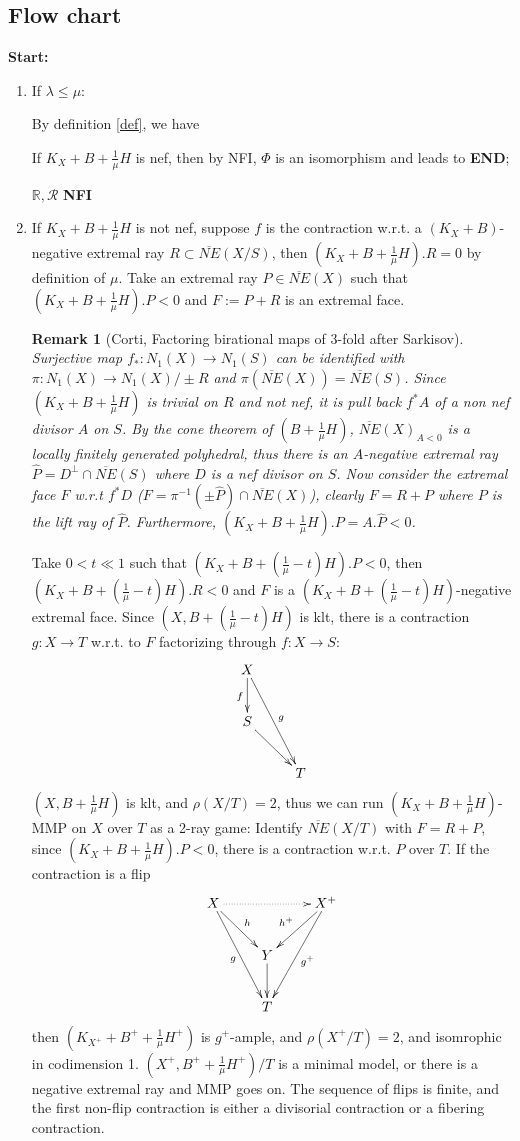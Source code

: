 \documentclass{article}
\newtheorem{rmk}[defn]{Remark}
\begin{document}
\subsection{Flow chart}

\textbf{Start:}
\begin{enumerate}[step 1]
\item If $ \lambda\leqslant\mu $:

By definition \ref{def}, we have 

If $ K_X+B+\frac{1}{\mu}H $ is nef, then by NFI, $ \Phi $ is an isomorphism and leads to \textbf{END};

$ \mathbb{R},\mathcal{R} $
\textbf{NFI}
\item If $ K_X+B+\frac{1}{\mu}H $ is not nef, suppose $ f $ is the contraction w.r.t.  a $ (K_X+B) $-negative extremal ray $ R\subset \overline{NE}(X/S) $, then $ (K_X+B+\frac{1}{\mu}H).R=0 $ by definition of $ \mu $.  Take an extremal ray $ P\in \overline{NE}(X) $ such that $ (K_X+B+\frac{1}{\mu}H).P<0 $ and $ F:=P+R $ is an extremal face.

\begin{rmk}
[Corti, Factoring birational maps of 3-fold after Sarkisov]

Surjective map $ f_*:N_1(X)\to N_1(S) $ can be identified with $ \pi: N_1(X)\to N_1(X)/\pm R $ and $ \pi(\overline{NE}(X))=\overline{NE}(S) $. Since $ (K_X+B+\frac{1}{\mu}H) $ is trivial on $ R $ and not nef, it is pull back $ f^*A $ of a non nef divisor $ A $ on $ S $. By the cone theorem of $ (B+\frac{1}{\mu}H) $, $ \overline{NE}(X)_{A<0} $ is a locally finitely generated polyhedral, thus there is an  $ A $-negative extremal ray $ \hat P=D^\perp\cap \overline{NE}(S) $ where $ D $ is a nef divisor on $ S $. Now consider the extremal face $ F $ w.r.t $ f^*D $ ($ F=\pi^{-1}(\pm \hat P)\cap \overline{NE}(X) $), clearly $ F=R+P $ where $ P $ is the lift ray of $ \hat P $. Furthermore, $ (K_X+B+\frac{1}{\mu}H).P=A.\hat P<0 $.
\end{rmk}
Take  $ 0<t\ll 1 $ such that $ (K_X+B+(\frac{1}{\mu}-t)H).P<0 $, then $  (K_X+B+(\frac{1}{\mu}-t)H).R<0 $ and $ F $ is a $  (K_X+B+(\frac{1}{\mu}-t)H) $-negative extremal face. Since $ (X,B+(\frac{1}{\mu}-t)H) $ is klt, there is  a contraction $ g:X\to T $ w.r.t. to $ F $ factorizing through $ f:X\to S $: 
$$ \xymatrix{
X\ar[d]_f\ar[ddr]^g&\\
S\ar[dr]&\\
&T }$$
$ (X,B+\frac{1}{\mu}H) $ is klt, and $ \rho(X/T)=2 $, thus we can  run $ (K_X+B+\frac{1}{\mu}H) $-MMP on $ X $ over $ T $ as a 2-ray game: Identify $ \overline{NE}(X/T) $ with $ F=R+P $, since $ (K_X+B+\frac{1}{\mu}H).P<0 $, there is a contraction w.r.t. $ P $ over $ T $. If the contraction is a flip
$$ \xymatrix{
X\ar[ddr]_g\ar@{.>}[rr]\ar[rd]^h&&X^+\ar[ddl]^{g^+}\ar[ld]_{h^+}\\
&Y\ar[d]&\\
&T&} $$ 
then $ (K_{X^+}+B^++\frac{1}{\mu}H^+) $ is $ g^+ $-ample, and $ \rho(X^+/T)=2 $, and isomrophic in codimension 1. $ (X^+,B^++\frac{1}{\mu}H^+)/T $ is a minimal model, or there is a negative extremal ray and MMP goes on. The sequence of flips is finite, and the first non-flip contraction is either a divisorial contraction or a fibering contraction.


\end{enumerate}
\end{document}
